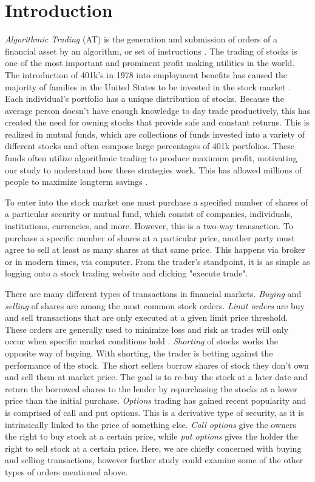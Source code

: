 \documentclass[../thesis.tex]{subfiles}
\begin{document}
\chapter{Introduction}
\label{ch:intro}

\textit{Algorithmic Trading} (AT) is the generation and submission of orders of a financial asset by an algorithm, or set of instructions \cite{Treleaven2013}. The trading of stocks is one of the most important and prominent profit making utilities in the world. The introduction of 401k's in 1978 into employment benefits has caused the majority of families in the United States to be invested in the stock market \cite{Stobierski2018}. Each individual's portfolio has a unique distribution of stocks. Because the average person doesn't have enough knowledge to day trade productively, this has created the need for owning stocks that provide safe and constant returns. This is realized in mutual funds, which are collections of funds invested into a variety of different stocks and often compose large percentages of 401k portfolios. These funds often utilize algorithmic trading to produce maximum profit, motivating our study to understand how these strategies work. This has allowed millions of people to maximize longterm savings \cite{Treleaven2013}.

To enter into the stock market one must purchase a specified number of shares of a particular security or mutual fund, which consist of companies, individuals, institutions, currencies, and more. However, this is a two-way transaction. To purchase a specific number of shares at a particular price, another party must agree to sell at least as many shares at that same price. This happens via broker or in modern times, via computer. From the trader's standpoint, it is as simple as logging onto a stock trading website and clicking "execute trade". 

There are many different types of transactions in financial markets. \textit{Buying} and \textit{selling} of shares are among the most common stock orders. \textit {Limit orders} are buy and sell transactions that are only executed at a given limit price threshold. These orders are generally used to minimize loss and risk as trades will only occur when specific market conditions hold \cite{Aldridge2010}. \textit{Shorting} of stocks works the opposite way of buying. With shorting, the trader is betting against the performance of the stock. The short sellers borrow shares of stock they don't own and sell them at market price. The goal is to re-buy the stock at a later date and return the borrowed shares to the lender by repurchasing the stocks at a lower price than the initial purchase. \textit {Options} trading has gained recent popularity and is comprised of call and put options. This is a derivative type of security, as it is intrinsically linked to the price of something else. \textit {Call options} give the owners the right to buy stock at a certain price, while \textit{put options} gives the holder the right to sell stock at a certain price. Here, we are chiefly concerned with buying and selling transactions, however further study could examine some of the other types of orders mentioned above. 
\end{document}
